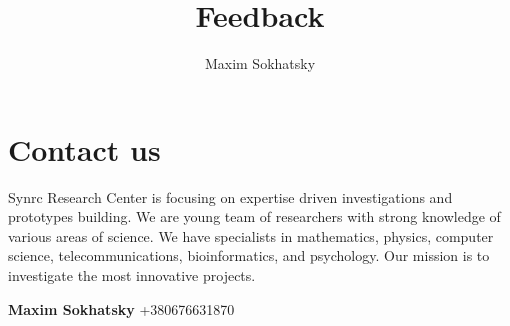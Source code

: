\documentclass[11pt]{article}
\begin{document}

\title{Feedback}
\author{Maxim Sokhatsky}


\section*{Contact us}

Synrc Research Center is focusing on expertise driven
investigations and prototypes building. We are young
team of researchers with strong knowledge of various
areas of science. We have specialists in mathematics,
physics, computer science, telecommunications,
bioinformatics, and psychology. Our mission is to investigate the most innovative
projects.

\textbf{Maxim Sokhatsky}  +380676631870
\end{document}
